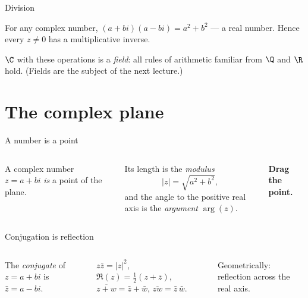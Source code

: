 \begin{frame}{Division}
\begin{fact}
For any complex number, $(a+bi)(a-bi) = a^2 + b^2$ — a real number.
Hence every $z \neq 0$ has a multiplicative inverse.
\end{fact}

\pause

\begin{steps}
\end{steps}

\pause

\begin{theorem}
$\C$ with these operations is a \emph{field}: all rules of arithmetic
familiar from $\Q$ and $\R$ hold. (Fields are the subject of the next lecture.)
\end{theorem}
\end{frame}

\section{The complex plane}

\begin{frame}{A number is a point}
\begin{columns}
\column
A complex number $z = a + bi$ \emph{is} a point of the plane.

Its length is the \emph{modulus}
\[
|z| = \sqrt{a^2 + b^2},
\]
and the angle to the positive real axis is the \emph{argument} $\arg(z)$.

\textbf{Drag the point.}
\column
{}
\end{columns}
\end{frame}

\begin{frame}{Conjugation is reflection}
\begin{columns}
\column
\begin{definition}
The \emph{conjugate} of $z = a+bi$ is $\bar z = a - bi$.
\end{definition}

\begin{fact}
$z \bar z = |z|^2$, \quad $\Re(z) = \tfrac12(z + \bar z)$, \quad
$\overline{z+w} = \bar z + \bar w$, \quad $\overline{zw} = \bar z\, \bar w$.
\end{fact}

Geometrically: reflection across the real axis.
\column
{}
\end{columns}
\end{frame}

